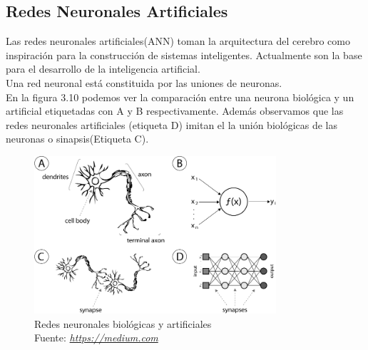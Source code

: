 \subsection{Redes Neuronales Artificiales}
Las redes neuronales artificiales(ANN) toman la arquitectura del cerebro como inspiración para la construcción de sistemas inteligentes. Actualmente son la base para el desarrollo de la inteligencia artificial.\\
Una red neuronal está constituida por las uniones de neuronas.\\
En la figura 3.10 podemos ver la comparación entre una neurona biológica y un artificial etiquetadas con A y B respectivamente. Además observamos que las redes neuronales artificiales (etiqueta D) imitan el la unión biológicas de las neuronas o sinapsis(Etiqueta C).

\begin{figure}[H]
	\centering
	\includegraphics[width=0.8\textwidth]{Figures/ANN.png}
	\caption{Redes neuronales biológicas y artificiales \\ Fuente:  \href{https://medium.com/@ivanliljeqvist/the-essence-of-artificial-neural-networks-5de300c995d6}{\textit{https://medium.com}}}
	\label{neuronas}
\end{figure} 
